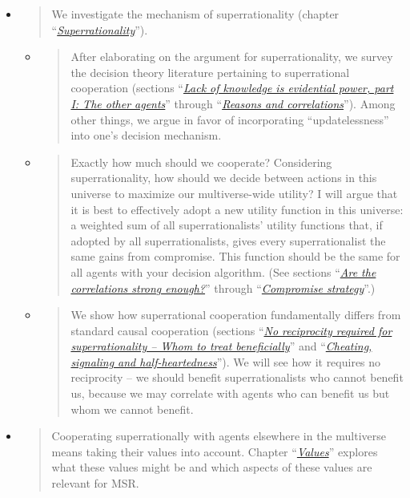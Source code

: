 \begin{itemize}
\item
  \begin{quote}
  We investigate the mechanism of superrationality (chapter
  ``\protect\hyperlink{superrationality}{\emph{Superrationality}}'').
  \end{quote}

  \begin{itemize}
  \item
    \begin{quote}
    After elaborating on the argument for superrationality, we survey
    the decision theory literature pertaining to superrational
    cooperation (sections
    ``\protect\hyperlink{lack-of-knowledge-is-evidential-power-part-i-the-other-agents}{\emph{Lack
    of knowledge is evidential power, part I: The other agents}}''
    through ``\protect\hyperlink{reasons-and-correlations}{\emph{Reasons
    and correlations}}''). Among other things, we argue in favor of
    incorporating ``updatelessness'' into one's decision mechanism.
    \end{quote}
  \item
    \begin{quote}
    Exactly how much should we cooperate? Considering superrationality,
    how should we decide between actions in this universe to maximize
    our multiverse-wide utility? I will argue that it is best to
    effectively adopt a new utility function in this universe: a
    weighted sum of all superrationalists' utility functions that, if
    adopted by all superrationalists, gives every superrationalist the
    same gains from compromise. This function should be the same for all
    agents with your decision algorithm. (See sections
    ``\protect\hyperlink{are-the-correlations-strong-enough}{\emph{Are
    the correlations strong enough?}}'' through
    ``\protect\hyperlink{compromise-strategy}{\emph{Compromise
    strategy}}''.)
    \end{quote}
  \item
    \begin{quote}
    We show how superrational cooperation fundamentally differs from
    standard causal cooperation (sections
    ``\protect\hyperlink{no-reciprocity-needed-whom-to-treat-beneficially}{\emph{No
    reciprocity required for superrationality -- Whom to treat
    beneficially}}'' and
    ``\protect\hyperlink{cheating-signaling-and-half-heartedness}{\emph{Cheating,
    signaling and half-heartedness}}''). We will see how it requires no
    reciprocity -- we should benefit superrationalists who cannot
    benefit us, because we may correlate with agents who can benefit us
    but whom we cannot benefit.
    \end{quote}
  \end{itemize}
\item
  \begin{quote}
  Cooperating superrationally with agents elsewhere in the multiverse
  means taking their values into account. Chapter
  ``\protect\hyperlink{values}{\emph{Values}}'' explores what these
  values might be and which aspects of these values are relevant for
  MSR.
  \end{quote}


\end{itemize}

